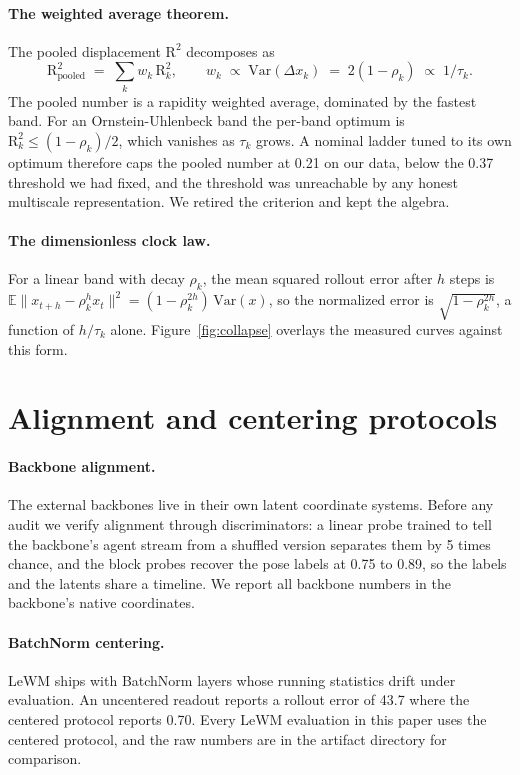 \documentclass[11pt]{article}
\newcommand{\tauc}{\tau}
\begin{document}
\paragraph{The weighted average theorem.}
The pooled displacement $\mathrm{R}^2$ decomposes as
\begin{equation}
\mathrm{R}^2_{\mathrm{pooled}} \;=\; \sum_k w_k \,\mathrm{R}^2_k, \qquad
w_k \;\propto\; \mathrm{Var}(\Delta x_k) \;=\; 2(1-\rho_k) \;\propto\; 1/\tauc_k .
\end{equation}
The pooled number is a rapidity weighted average, dominated by the fastest band.
For an Ornstein-Uhlenbeck band the per-band optimum is $\mathrm{R}^2_k \leq (1-\rho_k)/2$, which vanishes as $\tauc_k$ grows.
A nominal ladder tuned to its own optimum therefore caps the pooled number at 0.21 on our data, below the 0.37 threshold we had fixed, and the threshold was unreachable by any honest multiscale representation.
We retired the criterion and kept the algebra.

\paragraph{The dimensionless clock law.}
For a linear band with decay $\rho_k$, the mean squared rollout error after $h$ steps is $\mathbb{E}\|x_{t+h} - \rho_k^h x_t\|^2 = (1 - \rho_k^{2h})\,\mathrm{Var}(x)$, so the normalized error is $\sqrt{1-\rho_k^{2h}}$, a function of $h/\tauc_k$ alone.
Figure~\ref{fig:collapse} overlays the measured curves against this form.

\section{Alignment and centering protocols}
\label{app:protocols}

\paragraph{Backbone alignment.}
The external backbones live in their own latent coordinate systems.
Before any audit we verify alignment through discriminators: a linear probe trained to tell the backbone's agent stream from a shuffled version separates them by 5 times chance, and the block probes recover the pose labels at 0.75 to 0.89, so the labels and the latents share a timeline.
We report all backbone numbers in the backbone's native coordinates.

\paragraph{BatchNorm centering.}
LeWM ships with BatchNorm layers whose running statistics drift under evaluation.
An uncentered readout reports a rollout error of 43.7 where the centered protocol reports 0.70.
Every LeWM evaluation in this paper uses the centered protocol, and the raw numbers are in the artifact directory for comparison.
\end{document}

